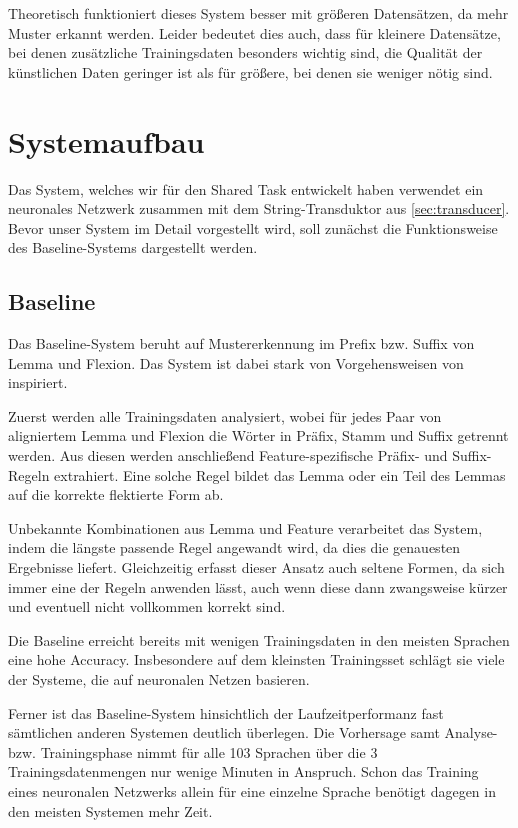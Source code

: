 \documentclass[11pt,a4paper]{article}
\begin{document}
Theoretisch funktioniert dieses System besser mit größeren Datensätzen, da mehr Muster erkannt werden. Leider bedeutet dies auch, dass für kleinere Datensätze, bei denen zusätzliche Trainingsdaten besonders wichtig sind, die Qualität der künstlichen Daten geringer ist als für größere, bei denen sie weniger nötig sind.

\section{Systemaufbau}
\label{sec:architecture}
Das System, welches wir für den Shared Task entwickelt haben verwendet ein neuronales Netzwerk zusammen mit dem String-Transduktor aus \autoref{sec:transducer}. Bevor unser System im Detail vorgestellt wird, soll zunächst die Funktionsweise des Baseline-Systems dargestellt werden.

\subsection{Baseline}
\label{sec:baseline}
Das Baseline-System beruht auf Mustererkennung im Prefix bzw. Suffix von Lemma und Flexion. Das System ist dabei stark von Vorgehensweisen von \citet{baseline:Ling2016} inspiriert.

Zuerst werden alle Trainingsdaten analysiert, wobei für jedes Paar von aligniertem Lemma und Flexion die Wörter in Präfix, Stamm und Suffix getrennt werden. Aus diesen werden anschließend Feature-spezifische Präfix- und Suffix-Regeln extrahiert. Eine solche Regel bildet das Lemma oder ein Teil des Lemmas auf die korrekte flektierte Form ab.

Unbekannte Kombinationen aus Lemma und Feature verarbeitet das System, indem die längste passende Regel angewandt wird, da dies die genauesten Ergebnisse liefert. Gleichzeitig erfasst dieser Ansatz auch seltene Formen, da sich immer eine der Regeln anwenden lässt, auch wenn diese dann zwangsweise kürzer und eventuell nicht vollkommen korrekt sind.

Die Baseline erreicht bereits mit wenigen Trainingsdaten in den meisten Sprachen eine hohe Accuracy. Insbesondere auf dem kleinsten Trainingsset schlägt sie viele der Systeme, die auf neuronalen Netzen basieren.

Ferner ist das Baseline-System hinsichtlich der Laufzeitperformanz fast sämtlichen anderen Systemen deutlich überlegen. Die Vorhersage samt Analyse- bzw. Trainingsphase nimmt für alle 103 Sprachen über die 3 Trainingsdatenmengen nur wenige Minuten in Anspruch. Schon das Training eines neuronalen Netzwerks allein für eine einzelne Sprache benötigt dagegen in den meisten Systemen mehr Zeit.
\end{document}
